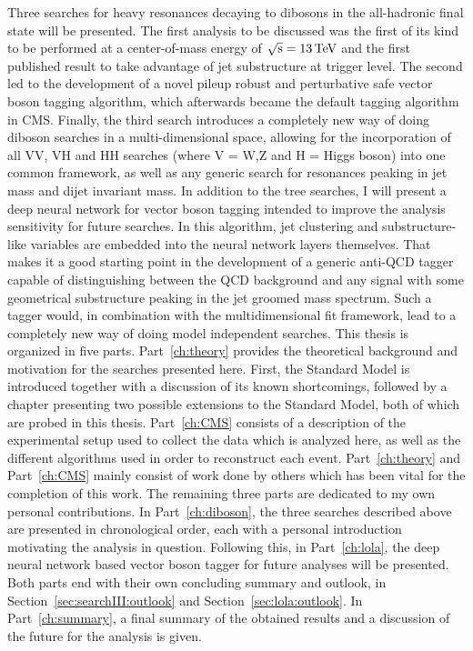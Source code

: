\newline
Three searches for heavy resonances decaying to dibosons in the all-hadronic final state will be presented. The first analysis to be discussed was the first of its kind to be performed at a center-of-mass energy of $\sqrt{\rm{s}}=13 \,\text{Te\hspace{-.08em}V}$ and the first published result to take advantage of jet substructure at trigger level. The second led to the development of a novel pileup robust and perturbative safe vector boson tagging algorithm, which afterwards became the default tagging algorithm in CMS. Finally, the third search introduces a completely new way of doing diboson searches in a multi-dimensional space, allowing for the incorporation of all VV, VH and HH searches (where V = W,Z and H = Higgs boson) into one common framework, as well as any generic search for resonances peaking in jet mass and dijet invariant mass.
\newline
\newline
In addition to the tree searches, I will present a deep neural network for vector boson tagging intended to improve the analysis sensitivity for future searches. In this algorithm, jet clustering and substructure-like variables are embedded into the neural network layers themselves. That makes it a good starting point in the development of a generic anti-QCD tagger capable of distinguishing between the QCD background and any signal with some geometrical substructure peaking in the jet groomed mass spectrum. Such a tagger would, in combination with the multidimensional fit framework, lead to a completely new way of doing model independent searches.
\newline
\newline
This thesis is organized in five parts. Part~\ref{ch:theory} provides the theoretical background and motivation for the searches presented here. First, the Standard Model is introduced together with a discussion of its known shortcomings, followed by a chapter presenting two possible extensions to the Standard Model, both of which are probed in this thesis. Part~\ref{ch:CMS} consists of a description of the experimental setup used to collect the data which is analyzed here, as well as the different algorithms used in order to reconstruct each event. Part~\ref{ch:theory} and Part~\ref{ch:CMS} mainly consist of work done by others which has been vital for the completion of this work. The remaining three parts are dedicated to my own personal contributions. In Part~\ref{ch:diboson}, the three searches described above are presented in chronological order, each with a personal introduction motivating the analysis in question. Following this, in Part~\ref{ch:lola}, the deep neural network based vector boson tagger for future analyses will be presented. Both parts end with their own concluding summary and outlook, in Section~\ref{sec:searchIII:outlook} and Section~\ref{sec:lola:outlook}. In Part~\ref{ch:summary}, a final summary of the obtained results and a discussion of the future for the analysis is given.